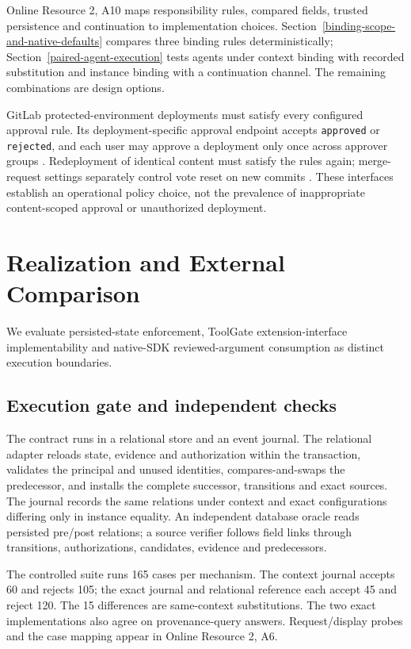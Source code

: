 \documentclass[pdflatex,sn-basic]{sn-jnl}
\begin{document}
Online Resource 2, A10 maps responsibility rules, compared fields, trusted persistence and continuation to implementation choices. Section~\ref{binding-scope-and-native-defaults} compares three binding rules deterministically; Section~\ref{paired-agent-execution} tests agents under context binding with recorded substitution and instance binding with a continuation channel. The remaining combinations are design options.

GitLab protected-environment deployments must satisfy every configured approval rule. Its deployment-specific approval endpoint accepts \texttt{approved} or \texttt{rejected}, and each user may approve a deployment only once across approver groups \citep{gitlab-deployment-approval}. Redeployment of identical content must satisfy the rules again; merge-request settings separately control vote reset on new commits \citep{gitlab-approvals}. These interfaces establish an operational policy choice, not the prevalence of inappropriate content-scoped approval or unauthorized deployment.

\section{Realization and External Comparison}\label{realization-and-external-comparison}

We evaluate persisted-state enforcement, ToolGate extension-interface implementability and native-SDK reviewed-argument consumption as distinct execution boundaries.

\subsection{Execution gate and independent checks}\label{execution-gate-and-independent-checks}

The contract runs in a relational store and an event journal. The relational adapter reloads state, evidence and authorization within the transaction, validates the principal and unused identities, compares-and-swaps the predecessor, and installs the complete successor, transitions and exact sources. The journal records the same relations under context and exact configurations differing only in instance equality. An independent database oracle reads persisted pre/post relations; a source verifier follows field links through transitions, authorizations, candidates, evidence and predecessors.

The controlled suite runs 165 cases per mechanism. The context journal accepts 60 and rejects 105; the exact journal and relational reference each accept 45 and reject 120. The 15 differences are same-context substitutions. The two exact implementations also agree on provenance-query answers. Request/display probes and the case mapping appear in Online Resource 2, A6.
\end{document}
